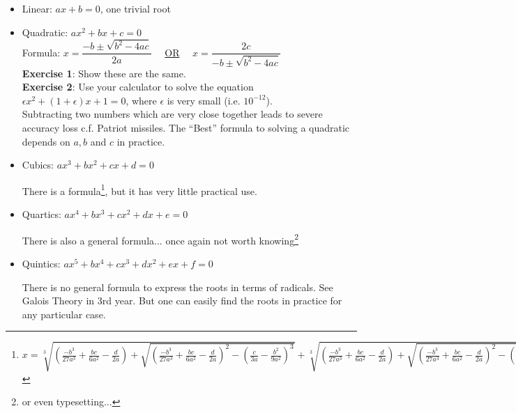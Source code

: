 \begin{itemize}

\item Linear: $ax + b = 0$, one trivial root

\item Quadratic: $ax^2 + bx + c = 0$\\

Formula: $x = \dfrac{-b \pm \sqrt{b^2 - 4ac}}{2a} \quad$ \underline{OR} $\quad x = \dfrac{2c}{-b \pm \sqrt{b^2 - 4ac}}$\\


\textbf{Exercise 1}: Show these are the same. \\
\textbf{Exercise 2}: Use your calculator to solve the equation $\epsilon x^2 + (1 + \epsilon)x + 1 = 0$, where $\epsilon$ is very small (i.e. $10^{-12}$).\\

Subtracting two numbers which are very close together leads to severe accuracy loss c.f. Patriot missiles. The ``Best'' formula to solving a quadratic depends on $a, b$ and $c$ in practice.\\

\item Cubics: $ax^3 + bx^2 + cx + d = 0$

There is a formula\footnote{$x = \sqrt[3]{\left(\frac{-b^3}{27a^3} + \frac{bc}{6a^2} - \frac{d}{2a}\right) + \sqrt{\left(\frac{-b^3}{27a^3} + \frac{bc}{6a^2}-\frac{d}{2a}\right)^2 - \left(\frac{c}{3a}-\frac{b^2}{9a^2}\right)^3}} + \sqrt[3]{\left(\frac{-b^3}{27a^3}+\frac{bc}{6a^2}-\frac{d}{2a}\right) + \sqrt{\left(\frac{-b^3}{27a^3}+\frac{bc}{6a^2}-\frac{d}{2a}\right)^2 - \left(\frac{c}{3a}-\frac{b^2}{9a^2}\right)^3}} - \frac{b}{3a}$},
 but it has very little practical use.\\

\item Quartics: $ax^4 + bx^3 + cx^2 + dx + e = 0$

There is also a general formula... once again not worth knowing\footnote{or even typesetting...}\\

\item Quintics: $ax^5 + bx^4 + cx^3 + dx^2 + ex + f = 0$

There is no general formula to express the roots in terms of radicals. See Galois Theory in 3rd year. But one can easily find the roots in practice for any particular case.\\


\end{itemize}

